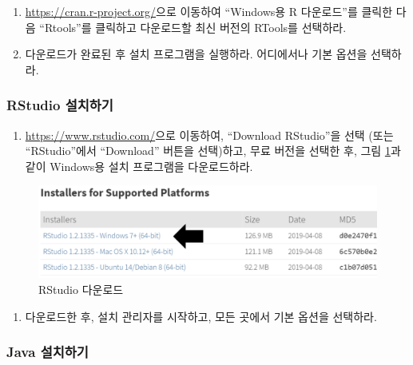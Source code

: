 \documentclass[10.5pt]{book}
\providecommand{\tightlist}{%
  \setlength{\itemsep}{0pt}\setlength{\parskip}{0pt}}
\theoremstyle{definition}
\theoremstyle{definition}
\theoremstyle{definition}
\theoremstyle{remark}
\begin{document}
\begin{enumerate}
\def\labelenumi{\arabic{enumi}.}
\item
  \url{https://cran.r-project.org/}으로 이동하여 ``Windows용 R
  다운로드''를 클릭한 다음 ``Rtools''를 클릭하고 다운로드할 최신 버전의
  RTools를 선택하라.
\item
  다운로드가 완료된 후 설치 프로그램을 실행하라. 어디에서나 기본 옵션을
  선택하라.
\end{enumerate}

\subsubsection*{RStudio 설치하기}\label{rstudio-}

\begin{enumerate}
\def\labelenumi{\arabic{enumi}.}
\tightlist
\item
  \url{https://www.rstudio.com/}으로 이동하여, ``Download RStudio''을
  선택 (또는 ``RStudio''에서 ``Download'' 버튼을 선택)하고, 무료 버전을
  선택한 후, 그림 \ref{fig:downloadRStudio}과 같이 Windows용 설치
  프로그램을 다운로드하라.
\end{enumerate}

\begin{figure}

{\centering \includegraphics[width=1\linewidth]{images/OhdsiAnalyticsTools/downloadRStudio} 

}

\caption{RStudio 다운로드}\label{fig:downloadRStudio}
\end{figure}

\begin{enumerate}
\def\labelenumi{\arabic{enumi}.}
\setcounter{enumi}{1}
\tightlist
\item
  다운로드한 후, 설치 관리자를 시작하고, 모든 곳에서 기본 옵션을
  선택하라.
\end{enumerate}

\subsubsection*{Java 설치하기}\label{java-}
\end{document}

